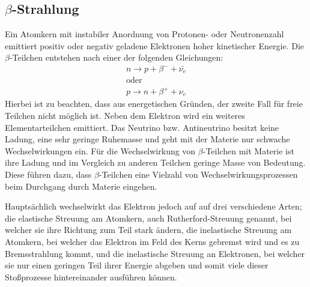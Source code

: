\subsection{\texorpdfstring{$\beta$}{Beta}-Strahlung}
Ein Atomkern mit instabiler Anordnung von Protonen- oder Neutronenzahl emittiert positiv oder negativ geladene Elektronen hoher kinetischer Energie.
Die $\beta$-Teilchen entstehen nach einer der folgenden Gleichungen:
\begin{eqnarray}
n \rightarrow p + \beta^- + \bar{\nu_e} \\
\nonumber
\text{oder}\\
p \rightarrow n + \beta^+ + \nu_e
\end{eqnarray}
Hierbei ist zu beachten, dass aus energetischen Gründen, der zweite Fall für freie Teilchen nicht möglich ist.
Neben dem Elektron wird ein weiteres Elementarteilchen emittiert.
Das Neutrino bzw. Antineutrino besitzt keine Ladung, eine sehr geringe Ruhemasse und geht mit der Materie nur schwache Wechselwirkungen ein.
Für die Wechselwirkung von $\beta$-Teilchen mit Materie ist ihre Ladung und im Vergleich zu anderen Teilchen geringe Masse von Bedeutung.
Diese führen dazu, dass $\beta$-Teilchen eine Vielzahl von Wechselwirkungsprozessen beim Durchgang durch Materie eingehen.


\noindent Hauptsächlich wechselwirkt das Elektron jedoch auf auf drei verschiedene Arten; die elastische Streuung am Atomkern, auch Rutherford-Streuung genannt,
bei welcher sie ihre Richtung zum Teil stark ändern, die inelastische Streuung am Atomkern, bei welcher das Elektron im Feld
des Kerns gebremst wird und es zu Bremsstrahlung kommt, und die inelastische Streuung an Elektronen, bei welcher sie nur einen geringen Teil
ihrer Energie abgeben und somit viele dieser Stoßprozesse hintereinander ausführen können.



